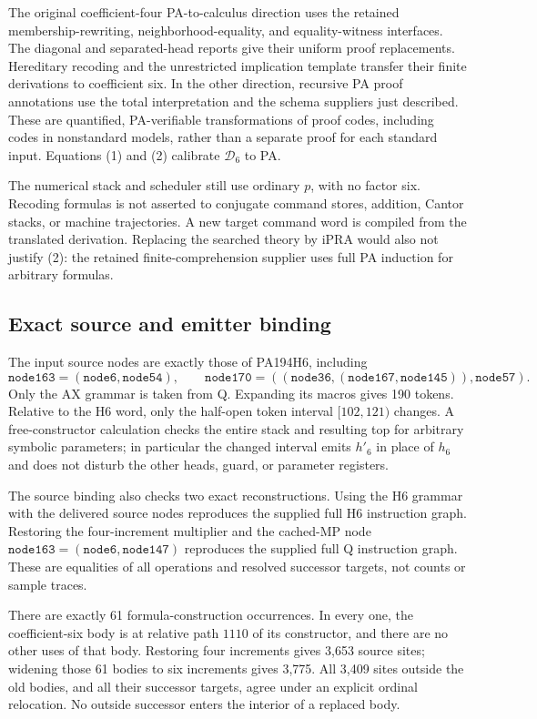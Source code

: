 The original coefficient-four PA-to-calculus direction uses the retained
membership-rewriting, neighborhood-equality, and equality-witness
interfaces. The diagonal and separated-head reports give their uniform
proof replacements. Hereditary recoding and the unrestricted implication
template transfer their finite derivations to coefficient six. In the
other direction, recursive PA proof annotations use the total
interpretation and the schema suppliers just described. These are
quantified, PA-verifiable transformations of proof codes, including
codes in nonstandard models, rather than a separate proof for each
standard input. Equations (1) and (2) calibrate $\mathcal D_6$ to PA.

The numerical stack and scheduler still use ordinary $p$, with no factor
six. Recoding formulas is not asserted to conjugate command stores,
addition, Cantor stacks, or machine trajectories. A new target command
word is compiled from the translated derivation. Replacing the searched
theory by iPRA would also not justify (2): the retained finite-comprehension
supplier uses full PA induction for arbitrary formulas.

\subsection{Exact source and emitter binding}

The input source nodes are exactly those of PA194H6, including
\[
 \mathtt{node163}=(\mathtt{node6},\mathtt{node54}),\qquad
 \mathtt{node170}=((\mathtt{node36},
       (\mathtt{node167},\mathtt{node145})),\mathtt{node57}).
\]
Only the AX grammar is taken from Q. Expanding its macros gives 190
tokens. Relative to the H6 word, only the half-open token interval
$[102,121)$ changes. A free-constructor calculation checks the entire
stack and resulting top for arbitrary symbolic parameters; in particular
the changed interval emits $h'_6$ in place of $h_6$ and does not disturb
the other heads, guard, or parameter registers.

The source binding also checks two exact reconstructions. Using the H6
grammar with the delivered source nodes reproduces the supplied full
H6 instruction graph. Restoring the four-increment multiplier and the
cached-MP node $\mathtt{node163}=(\mathtt{node6},\mathtt{node147})$
reproduces the supplied full Q instruction graph. These are equalities
of all operations and resolved successor targets, not counts or sample
traces.

There are exactly 61 formula-construction occurrences. In every one,
the coefficient-six body is at relative path $1110$ of its constructor,
and there are no other uses of that body. Restoring four increments
gives 3,653 source sites; widening those 61 bodies to six increments
gives 3,775. All 3,409 sites outside the old bodies, and all their
successor targets, agree under an explicit ordinal relocation. No
outside successor enters the interior of a replaced body.


